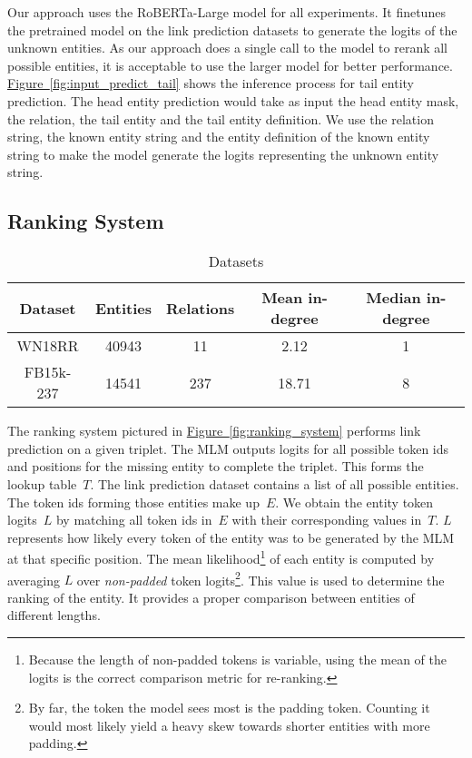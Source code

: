 \documentclass[11pt,a4paper]{article}
\newcommand{\RefFigure}[1]{\hyperref[#1]{Figure~\ref{#1}}}
\newcommand{\TableW}[3]{\begin{table*}[h!]
\begin{center}
  \caption{#3} 
  \vspace{-0.25\baselineskip}
  \label{#2}
  #1
\end{center}
\end{table*}}
\begin{document}
Our approach uses the RoBERTa-Large model for all experiments.
It finetunes the pretrained model on the link prediction datasets to generate the logits of the unknown entities.
As our approach does a single call to the model to rerank all possible entities, it is acceptable to use the larger model for better performance.
\RefFigure{fig:input_predict_tail} shows the inference process for tail entity prediction.
The head entity prediction would take as input the head entity mask, the relation, the tail entity and the tail entity definition.
We use the relation string, the known entity string and the entity definition of the known entity string to make the model generate the logits representing the unknown entity string.

\subsection{Ranking System}

\label{sec:datasets}
\TableW{\begin{tabular}{ccccc}
    \toprule
    Dataset & Entities & Relations & Mean in-degree & Median in-degree\\
    \midrule
    WN18RR & 40943 & 11 & 2.12 & 1\\
    FB15k-237 & 14541 & 237 & 18.71 & 8\\
    \bottomrule
  \end{tabular}}
{tab:datasets}
{Datasets}

The ranking system pictured in \RefFigure{fig:ranking_system} performs link prediction on a given triplet.
The MLM outputs logits for all possible token ids and positions for the missing entity to complete the triplet.
This forms the lookup table~$T$.
The link prediction dataset contains a list of all possible entities.
The token ids forming those entities make up~$E$.
We obtain the entity token logits~$L$ by matching all token ids in~$E$ with their corresponding values in~$T$.
$L$ represents how likely every token of the entity was to be generated by the MLM at that specific position.
The mean likelihood\footnote{Because the length of non-padded tokens is variable, using the mean of the logits is the correct comparison metric for re-ranking.} of each entity is computed by averaging $L$ over \textit{non-padded} token logits\footnote{By far, the token the model sees most is the padding token. Counting it would most likely yield a heavy skew towards shorter entities with more padding.}.
This value is used to determine the ranking of the entity.
It provides a proper comparison between entities of different lengths.
\end{document}
